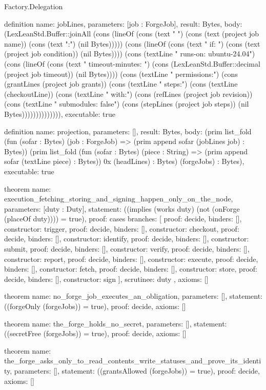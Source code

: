 \begin{lexlean}{Factory.Delegation}
\begin{semanticmodule}
definition{
  name: jobLines,
  parameters: [job : ForgeJob],
  result: Bytes,
  body: (LexLeanStd.Buffer::joinAll (cons (lineOf (cons (text "  ") (cons (text (project job name)) (cons (text ":") (nil Bytes))))) (cons (lineOf (cons (text "    if: ") (cons (text (project job condition)) (nil Bytes)))) (cons (textLine "    runs-on: ubuntu-24.04") (cons (lineOf (cons (text "    timeout-minutes: ") (cons (LexLeanStd.Buffer::decimal (project job timeout)) (nil Bytes)))) (cons (textLine "    permissions:") (cons (grantLines (project job grants)) (cons (textLine "    steps:") (cons (textLine (checkoutLine)) (cons (textLine "        with:") (cons (refLines (project job revision)) (cons (textLine "          submodules: false") (cons (stepLines (project job steps)) (nil Bytes)))))))))))))),
  executable: true
}

definition{
  name: projection,
  parameters: [],
  result: Bytes,
  body: (prim list_fold (fun (sofar : Bytes) (job : ForgeJob) => (prim append sofar (jobLines job) : Bytes)) (prim list_fold (fun (sofar : Bytes) (piece : String) => (prim append sofar (textLine piece) : Bytes)) 0x (headLines) : Bytes) (forgeJobs) : Bytes),
  executable: true
}

theorem{
  name: execution_fetching_storing_and_signing_happen_only_on_the_node,
  parameters: [duty : Duty],
  statement: ((implies (works duty) (not (onForge (placeOf duty)))) = true),
  proof: cases{
    branches: [
      {proof: decide{}, binders: [], constructor: trigger},
      {proof: decide{}, binders: [], constructor: checkout},
      {proof: decide{}, binders: [], constructor: identify},
      {proof: decide{}, binders: [], constructor: submit},
      {proof: decide{}, binders: [], constructor: verify},
      {proof: decide{}, binders: [], constructor: report},
      {proof: decide{}, binders: [], constructor: execute},
      {proof: decide{}, binders: [], constructor: fetch},
      {proof: decide{}, binders: [], constructor: store},
      {proof: decide{}, binders: [], constructor: sign}
    ],
    scrutinee: duty
  },
  axioms: []
}

theorem{
  name: no_forge_job_executes_an_obligation,
  parameters: [],
  statement: ((forgeOnly (forgeJobs)) = true),
  proof: decide{},
  axioms: []
}

theorem{
  name: the_forge_holds_no_secret,
  parameters: [],
  statement: ((secretFree (forgeJobs)) = true),
  proof: decide{},
  axioms: []
}

theorem{
  name: the_forge_asks_only_to_read_contents_write_statuses_and_prove_its_identity,
  parameters: [],
  statement: ((grantsAllowed (forgeJobs)) = true),
  proof: decide{},
  axioms: []
}


\end{semanticmodule}
\end{lexlean}
